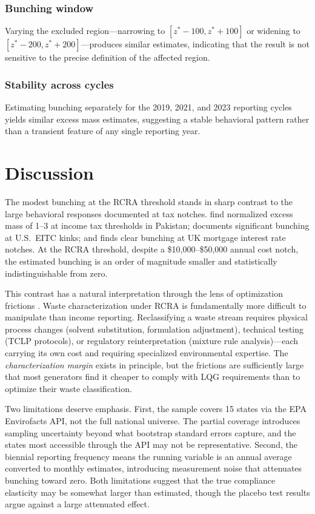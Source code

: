 \documentclass[12pt]{article}
\begin{document}
\subsubsection*{Bunching window} Varying the excluded region---narrowing to $[z^* - 100, z^* + 100]$ or widening to $[z^* - 200, z^* + 200]$---produces similar estimates, indicating that the result is not sensitive to the precise definition of the affected region.

\subsubsection*{Stability across cycles} Estimating bunching separately for the 2019, 2021, and 2023 reporting cycles yields similar excess mass estimates, suggesting a stable behavioral pattern rather than a transient feature of any single reporting year.


\section{Discussion}
\label{sec:discussion}

The modest bunching at the RCRA threshold stands in sharp contrast to the large behavioral responses documented at tax notches. \citet{kleven2013} find normalized excess mass of 1--3 at income tax thresholds in Pakistan; \citet{saez2010} documents significant bunching at U.S.\ EITC kinks; and \citet{best2023} finds clear bunching at UK mortgage interest rate notches. At the RCRA threshold, despite a \$10,000--\$50,000 annual cost notch, the estimated bunching is an order of magnitude smaller and statistically indistinguishable from zero.

This contrast has a natural interpretation through the lens of optimization frictions \citep{chetty2011}. Waste characterization under RCRA is fundamentally more difficult to manipulate than income reporting. Reclassifying a waste stream requires physical process changes (solvent substitution, formulation adjustment), technical testing (TCLP protocols), or regulatory reinterpretation (mixture rule analysis)---each carrying its own cost and requiring specialized environmental expertise. The \textit{characterization margin} exists in principle, but the frictions are sufficiently large that most generators find it cheaper to comply with LQG requirements than to optimize their waste classification.

Two limitations deserve emphasis. First, the sample covers 15 states via the EPA Envirofacts API, not the full national universe. The partial coverage introduces sampling uncertainty beyond what bootstrap standard errors capture, and the states most accessible through the API may not be representative. Second, the biennial reporting frequency means the running variable is an annual average converted to monthly estimates, introducing measurement noise that attenuates bunching toward zero. Both limitations suggest that the true compliance elasticity may be somewhat larger than estimated, though the placebo test results argue against a large attenuated effect.
\end{document}
